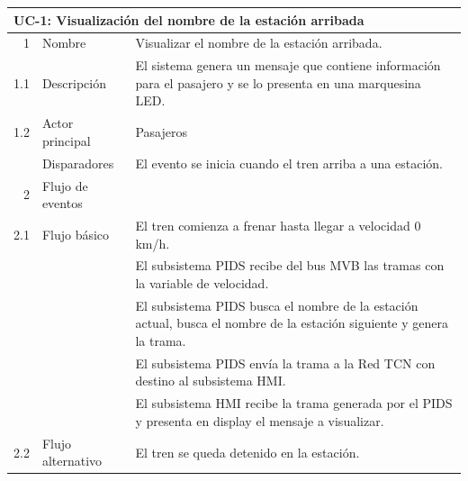 \begin{table}[]
\centering
\begin{tabular}{|lll|}
\hline
 
\multicolumn{3}{|l|}{{ \textbf{UC-1: Visualización del nombre de la estación arribada}}} \\ \hline
 
\multicolumn{1}{|r|}{{ 1}} & \multicolumn{1}{l|}{{ Nombre}} & { Visualizar el nombre de la estación arribada.} \\ \hline
 
\multicolumn{1}{|r|}{{ 1.1}} & \multicolumn{1}{l|}{{ Descripción}} & { El sistema genera un mensaje que contiene información para el pasajero y se lo presenta en una marquesina LED.} \\ \hline
 
\multicolumn{1}{|r|}{{ 1.2}} & \multicolumn{1}{l|}{{ Actor principal}} & { Pasajeros} \\ \hline
 
\multicolumn{1}{|l|}{{ }} & \multicolumn{1}{l|}{{ Disparadores}} & { El evento se inicia cuando el tren arriba a una estación.} \\ \hline
 
\multicolumn{1}{|r|}{{ 2}} & \multicolumn{1}{l|}{{ Flujo de eventos}} & { } \\ \hline
 
\multicolumn{1}{|r|}{{ 2.1}} & \multicolumn{1}{l|}{{ Flujo básico}} & { El tren comienza a frenar hasta llegar a velocidad 0 km/h.} \\
 
\multicolumn{1}{|l|}{{ }} & \multicolumn{1}{l|}{{ }} & { El subsistema PIDS recibe del bus MVB las tramas con la variable de velocidad.} \\
 
\multicolumn{1}{|l|}{{ }} & \multicolumn{1}{l|}{{ }} & { El subsistema PIDS busca el nombre de la estación actual, busca el nombre de la estación siguiente y genera la trama.} \\
 
\multicolumn{1}{|l|}{{ }} & \multicolumn{1}{l|}{{ }} & { El subsistema PIDS envía la trama a la Red TCN con destino al subsistema HMI.} \\
 
\multicolumn{1}{|l|}{{ }} & \multicolumn{1}{l|}{{ }} & { El subsistema HMI recibe la trama generada por el PIDS y presenta en display el mensaje a visualizar.} \\
\hline
 
\multicolumn{1}{|r|}{{ 2.2}} & \multicolumn{1}{l|}{{ Flujo alternativo}} & { El tren se queda detenido en la estación.} \\
 

\end{tabular}
\end{table}
